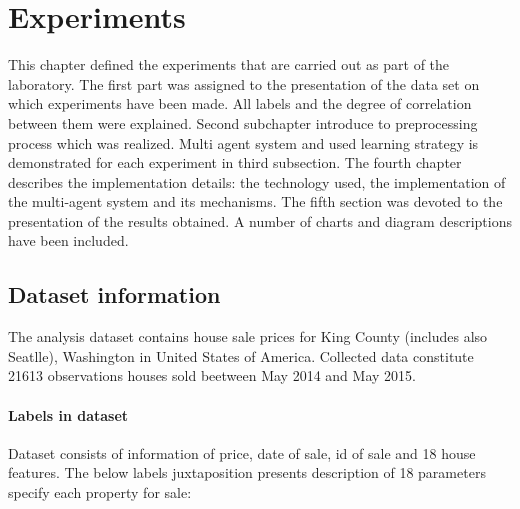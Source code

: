 
\chapter{Experiments}

\quad This chapter defined the experiments that are carried out as part of the laboratory. The first part was assigned to the presentation of the data set on which experiments have been made. All labels and the degree of correlation between them were explained. Second subchapter introduce to preprocessing process which was realized. Multi agent system and used learning strategy is demonstrated for each experiment in third subsection. The fourth chapter describes the implementation details: the technology used, the implementation of the multi-agent system and its mechanisms. The fifth section was devoted to the presentation of the results obtained. A number of charts and diagram descriptions have been included.


\section{Dataset information} 
The analysis dataset contains house sale prices for King County (includes also Seatlle), Washington in United States of America. Collected data constitute 21613 observations houses sold beetween May 2014 and May 2015.

\subsubsection{Labels in dataset}
Dataset consists of information of price, date of sale, id of sale and 18 house features. The below labels juxtaposition presents description of 18 parameters specify each property for sale:

